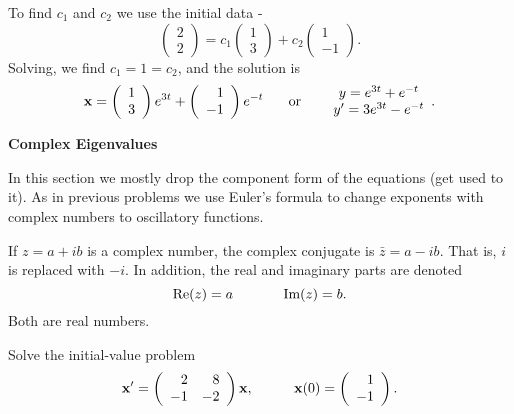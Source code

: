 \documentclass[leqno,DIV=calc,paper=a4,fontsize=11pt]{article}
\theoremstyle{definition}
\theoremstyle{plain}
\theoremstyle{remark}
\begin{document}
To find $c_1$ and $c_2$ we use the initial data -
\[
\left(\begin{array}{c}2\\2\end{array}\right)
= c_1\left(\begin{array}{c}1\\3\end{array}\right)
+c_2\left(\begin{array}{r}1\\-1\end{array}\right).
\]
Solving, we find $c_1=1=c_2$, and the solution is
\[
{\bf x}=\left(\begin{array}{c}1\\3\end{array}\right)e^{3t}
+\left(\begin{array}{r}1\\-1\end{array}\right)e^{-t}
\hspace{.25in} \mbox{or} \hspace{.25in}
\begin{array}{c}y=e^{3t}+e^{-t}\\y'=3e^{3t}-e^{-t}\end{array}.
\]

\pagebreak

\vspace{.5in}
\begin{center}{\bf\sc Complex Eigenvalues}\end{center}
In this section we mostly drop the component form of the equations
(get used to it). As in previous problems we use Euler's formula to
change exponents with complex numbers to oscillatory functions.

If $z=a+ib$ is a complex number, the complex conjugate is
$\bar{z}=a-ib$. That is, $i$ is replaced with $-i$. In addition,
the real and imaginary parts are denoted
\[
\mbox{Re}(z) = a \hspace{.5in} \mbox{Im}(z) = b.
\]
Both are real numbers.

\vspace{.2in}
 Solve the initial-value problem
\[
{\bf x}' = \left(\begin{array}{rr}2&8\\-1&-2\end{array}\right){\bf x},
\hspace{.4in}{\bf x}(0)=
\left(\begin{array}{r}1\\-1\end{array}\right).
\]
\end{document}
